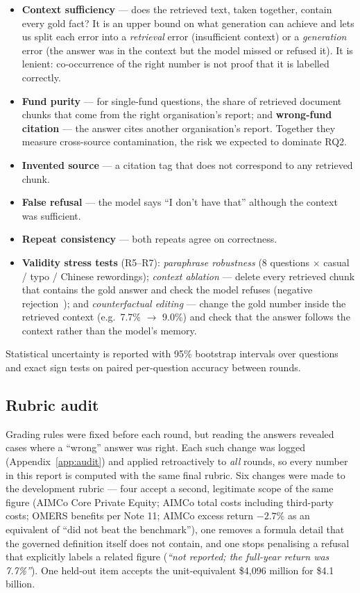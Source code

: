 \documentclass[11pt,a4paper]{article}
\begin{document}
\begin{itemize}
  \item \textbf{Context sufficiency} --- does the retrieved text, taken together, contain every gold fact? It is an
        upper bound on what generation can achieve and lets us split each error into a \emph{retrieval} error
        (insufficient context) or a \emph{generation} error (the answer was in the context but the model missed or
        refused it). It is lenient: co-occurrence of the right number is not proof that it is labelled correctly.
  \item \textbf{Fund purity} --- for single-fund questions, the share of retrieved document chunks that come from the
        right organisation's report; and \textbf{wrong-fund citation} --- the answer cites another organisation's
        report. Together they measure cross-source contamination, the risk we expected to dominate RQ2.
  \item \textbf{Invented source} --- a citation tag that does not correspond to any retrieved chunk.
  \item \textbf{False refusal} --- the model says ``I don't have that'' although the context was sufficient.
  \item \textbf{Repeat consistency} --- both repeats agree on correctness.
  \item \textbf{Validity stress tests} (R5--R7): \emph{paraphrase robustness} (8 questions $\times$ casual /
        typo / Chinese rewordings); \emph{context ablation} --- delete every retrieved chunk that contains the gold
        answer and check the model refuses (negative rejection~\citep{chen2024rgb}); and \emph{counterfactual
        editing} --- change the gold number inside the retrieved context (e.g.\ 7.7\% $\to$ 9.0\%) and check that the
        answer follows the context rather than the model's memory.
\end{itemize}
Statistical uncertainty is reported with 95\% bootstrap intervals over questions and exact sign tests on paired
per-question accuracy between rounds.

\subsection{Rubric audit}
Grading rules were fixed before each round, but reading the answers revealed cases where a ``wrong'' answer was
right. Each such change was logged (Appendix~\ref{app:audit}) and applied retroactively to \emph{all} rounds, so
every number in this report is computed with the same final rubric. Six changes were made to the development rubric
--- four accept a second, legitimate scope of the same figure (AIMCo Core Private Equity; AIMCo total costs including
third-party costs; OMERS benefits per Note 11; AIMCo excess return $-2.7\%$ as an equivalent of ``did not beat
the benchmark''), one removes a formula detail that the governed definition itself does not contain, and one stops
penalising a refusal that explicitly labels a related figure (\emph{``not reported; the full-year return was
7.7\%''}). One held-out item accepts the unit-equivalent \$4,096 million for \$4.1 billion.
\end{document}
